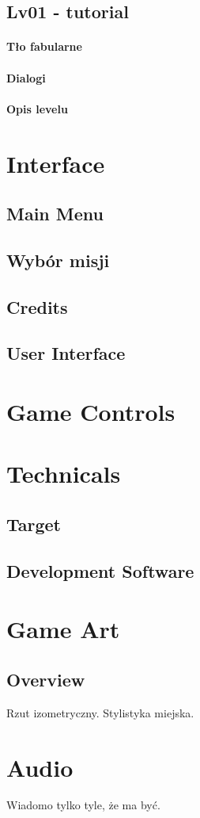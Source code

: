 \documentclass[12pt]{article}
\begin{document}
\subsection{Lv01 - tutorial}
\paragraph{Tło fabularne}
\paragraph{Dialogi}
\paragraph{Opis levelu}

\newpage
\section{Interface}
\subsection{Main Menu}
\subsection{Wybór misji}
\subsection{Credits}
\subsection{User Interface}

\newpage
\section{Game Controls}

\newpage
\section{Technicals}
\subsection{Target}
\subsection{Development Software}

\newpage
\section{Game Art}
\subsection{Overview}
Rzut izometryczny. Stylistyka miejska.

\section{Audio}
Wiadomo tylko tyle, że ma być.
\end{document}
